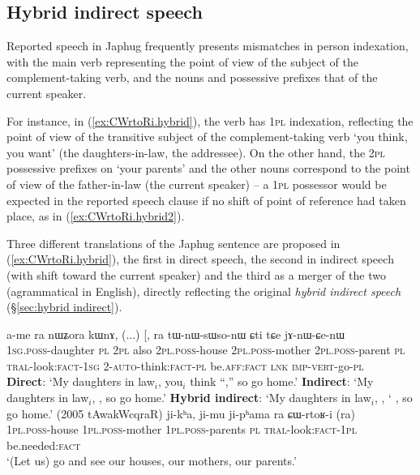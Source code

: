  
\subsection{Hybrid indirect speech} \label{sec:hybrid.intro}
Reported speech in Japhug frequently presents mismatches in person indexation, with the main verb representing the point of view of the subject of the complement-taking verb, and the nouns and possessive prefixes that of the current speaker.
 
For instance, in (\ref{ex:CWrtoRi.hybrid}), the verb  has \textsc{1pl} indexation, reflecting the point of view of the transitive subject of the complement-taking verb  `you think, you want' (the daughters-in-law, the addressee). On the other hand, the \textsc{2pl} possessive prefixes on  `your parents' and the other nouns correspond to the point of view of the father-in-law (the current speaker) -- a \textsc{1pl} possessor would be expected in the reported speech clause if no shift of point of reference had taken place, as in  (\ref{ex:CWrtoRi.hybrid2}).

Three different translations of the Japhug sentence are proposed in (\ref{ex:CWrtoRi.hybrid}), the first in direct speech, the second in indirect speech (with shift toward the current speaker) and the third as a merger of the two (agrammatical in English), directly reflecting the original \textit{hybrid indirect speech} (§\ref{sec:hybrid indirect}).

\begin{exe}
\ex 
\begin{xlist}
\ex \label{ex:CWrtoRi.hybrid}
\gll  a-me ra nɯʑora kɯnɤ, (...) [,   ra \bleu{ɕɯ-rtoʁ-i]} tɯ-nɯ-sɯso-nɯ ɕti tɕe jɤ-nɯ-ɕe-nɯ   \\
\textsc{1sg}.\textsc{poss}-daughter \textsc{pl} \textsc{2pl} also {  } \textsc{2pl}.\textsc{poss}-house \textsc{2pl}.\textsc{poss}-mother  \textsc{2pl}.\textsc{poss}-parent \textsc{pl} \textsc{tral}-look:\textsc{fact}-\textsc{1sg} 2-\textsc{auto}-think:\textsc{fact}-\textsc{pl} be.\textsc{aff}:\textsc{fact} \textsc{lnk} \textsc{imp}-\textsc{vert}-go-\textsc{pl} \\ 
\glt  \textbf{Direct}: `My daughters in law$_i$, you$_i$ think ``,'' so go home.' 
\glt  \textbf{Indirect}:   `My daughters in law$_i$, , so go home.'
\glt  \textbf{Hybrid indirect}: `My daughters in law$_i$, , ` , so go home.' (2005 tAwakWcqraR)
\ex \label{ex:CWrtoRi.hybrid2}
\gll ji-kʰa, ji-mu ji-pʰama ra ɕɯ-rtoʁ-i (ra)\\
\textsc{1pl}.\textsc{poss}-house \textsc{1pl}.\textsc{poss}-mother \textsc{1pl}.\textsc{poss}-parents \textsc{pl} \textsc{tral}-look:\textsc{fact}-\textsc{1pl} be.needed:\textsc{fact} \\
\glt `(Let us) go and see our houses, our mothers, our parents.' 
\end{xlist}
\end{exe}

